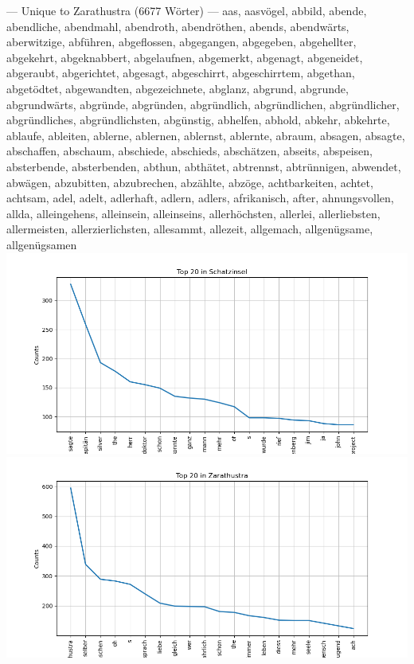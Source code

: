 \documentclass{scrartcl}
\begin{document}
--- Unique to Zarathustra (6677 Wörter) ---
aas, aasvögel, abbild, abende, abendliche, abendmahl, abendroth, abendröthen, abends, abendwärts, aberwitzige, abführen, abgeflossen, abgegangen, abgegeben, abgehellter, abgekehrt, abgeknabbert, abgelaufnen, abgemerkt, abgenagt, abgeneidet, abgeraubt, abgerichtet, abgesagt, abgeschirrt, abgeschirrtem, abgethan, abgetödtet, abgewandten, abgezeichnete, abglanz, abgrund, abgrunde, abgrundwärts, abgründe, abgründen, abgründlich, abgründlichen, abgründlicher, abgründliches, abgründlichsten, abgünstig, abhelfen, abhold, abkehr, abkehrte, ablaufe, ableiten, ablerne, ablernen, ablernst, ablernte, abraum, absagen, absagte, abschaffen, abschaum, abschiede, abschieds, abschätzen, abseits, abspeisen, absterbende, absterbenden, abthun, abthätet, abtrennst, abtrünnigen, abwendet, abwägen, abzubitten, abzubrechen, abzählte, abzöge, achtbarkeiten, achtet, achtsam, adel, adelt, adlerhaft, adlern, adlers, afrikanisch, after, ahnungsvollen, allda, alleingehens, alleinsein, alleinseins, allerhöchsten, allerlei, allerliebsten, allermeisten, allerzierlichsten, allesammt, allezeit, allgemach, allgenügsame, allgenügsamen\\
\includegraphics*[scale=0.6]{schatztop20.png}\\
\includegraphics*[scale=0.6]{zaraop20.png}\\
\end{document}
